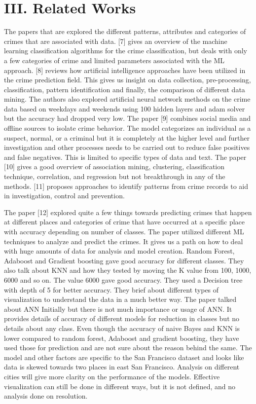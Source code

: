 \documentclass[11 pt,conference,final,]{IEEEtran}
\begin{document}
\section{III. Related Works}\label{ii.-related-works}

The papers that are explored the different patterns, attributes and
categories of crimes that are associated with data. {[}7{]} gives an
overview of the machine learning classification algorithms for the crime
classification, but deals with only a few categories of crime and
limited parameters associated with the ML approach. {[}8{]} reviews how
artificial intelligence approaches have been utilized in the crime
prediction field. This gives us insight on data collection,
pre-processing, classification, pattern identification and finally, the
comparison of different data mining. The authors also explored
artificial neural network methods on the crime data based on weekdays
and weekends using 100 hidden layers and adam solver but the accuracy
had dropped very low. The paper {[}9{]} combines social media and
offline sources to isolate crime behavior. The model categorizes an
individual as a suspect, normal, or a criminal but it is completely at
the higher level and further investigation and other processes needs to
be carried out to reduce false positives and false negatives. This is
limited to specific types of data and text. The paper {[}10{]} gives a
good overview of association mining, clustering, classification
technique, correlation, and regression but not breakthrough in any of
the methods. {[}11{]} proposes approaches to identify patterns from
crime records to aid in investigation, control and prevention.

The paper {[}12{]} explored quite a few things towards predicting crimes
that happen at different places and categories of crime that have
occurred at a specific place with accuracy depending on number of
classes. The paper utilized different ML techniques to analyze and
predict the crimes. It gives us a path on how to deal with huge amounts
of data for analysis and model creation. Random Forest, Adaboost and
Gradient boosting gave good accuracy for different classes. They also
talk about KNN and how they tested by moving the K value from 100, 1000,
6000 and so on. The value 6000 gave good accuracy. They used a Decision
tree with depth of 5 for better accuracy. They brief about different
types of visualization to understand the data in a much better way. The
paper talked about ANN Initially but there is not much importance or
usage of ANN. It provides details of accuracy of different models for
reduction in classes but no details about any class. Even though the
accuracy of naive Bayes and KNN is lower compared to random forest,
Adaboost and gradient boosting, they have used those for prediction and
are not sure about the reason behind the same. The model and other
factors are specific to the San Francisco dataset and looks like data is
skewed towards two places in east San Francisco. Analysis on different
cities will give more clarity on the performance of the models.
Effective visualization can still be done in different ways, but it is
not defined, and no analysis done on resolution.
\end{document}
